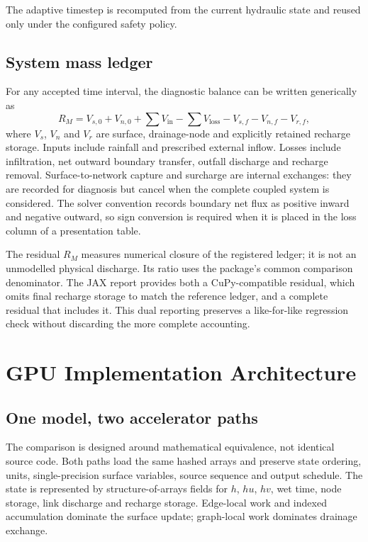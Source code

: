 \documentclass[11pt,a4paper,oneside]{report}
\begin{document}
The adaptive timestep is recomputed from the current hydraulic state and reused only under
the configured safety policy.

\section{System mass ledger}
For any accepted time interval, the diagnostic balance can be written generically as
\begin{equation}
 R_M=V_{s,0}+V_{n,0}+\sum V_{\mathrm{in}}
       -\sum V_{\mathrm{loss}}-V_{s,f}-V_{n,f}-V_{r,f},
 \label{eq:massledger}
\end{equation}
where $V_s$, $V_n$ and $V_r$ are surface, drainage-node and explicitly retained recharge
storage. Inputs include rainfall and prescribed external inflow. Losses include
infiltration, net outward boundary transfer, outfall discharge and recharge removal.
Surface-to-network capture and surcharge are internal exchanges: they are recorded for
diagnosis but cancel when the complete coupled system is considered. The solver convention
records boundary net flux as positive inward and negative outward, so sign conversion is
required when it is placed in the loss column of a presentation table.

The residual $R_M$ measures numerical closure of the registered ledger; it is not an
unmodelled physical discharge. Its ratio uses the package's common comparison denominator.
The JAX report provides both a CuPy-compatible residual, which omits final recharge storage
to match the reference ledger, and a complete residual that includes it. This dual reporting
preserves a like-for-like regression check without discarding the more complete accounting.

\chapter{GPU Implementation Architecture}\label{chap:gpu}
\section{One model, two accelerator paths}
The comparison is designed around mathematical equivalence, not identical source code.
Both paths load the same hashed arrays and preserve state ordering, units, single-precision
surface variables, source sequence and output schedule. The state is represented by
structure-of-arrays fields for $h$, $hu$, $hv$, wet time, node storage, link discharge and
recharge storage. Edge-local work and indexed accumulation dominate the surface update;
graph-local work dominates drainage exchange.
\end{document}
